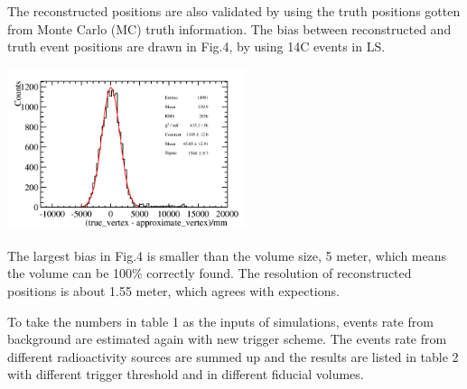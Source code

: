 \documentclass[a4paper,10pt,twoside]{paper}
\begin{document}
\begin{multicols}{2}
		The reconstructed positions are also validated by using the truth positions gotten from Monte Carlo (MC) truth information. 
		The bias between reconstructed and truth event positions are drawn in Fig.4, by using 14C events in LS. 

		\begin{center}
			\includegraphics[width=7cm]{C14_deltaR_new.png}
		\end{center}

		The largest bias in Fig.4 is smaller than the volume size, 5 meter, which means the volume can be 100\% correctly found.
		The resolution of reconstructed positions is about 1.55 meter, which agrees with expections.


		To take the numbers in table 1 as the inputs of simulations, events rate from background are estimated again with new trigger scheme. 
		The events rate from different radioactivity sources are summed up and the results are listed in table 2 with different trigger threshold and in
		different fiducial volumes.


	\end{multicols}
\end{document}
